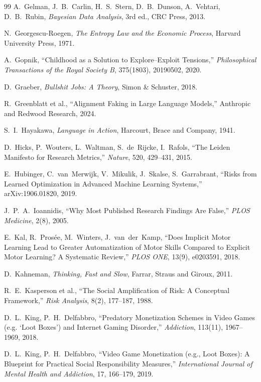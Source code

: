 \begin{thebibliography}{99}
A.~Gelman, J.~B.~Carlin, H.~S.~Stern, D.~B.~Dunson, A.~Vehtari, D.~B.~Rubin, \textit{Bayesian Data Analysis}, 3rd ed., CRC Press, 2013.

N.~Georgescu-Roegen, \textit{The Entropy Law and the Economic Process}, Harvard University Press, 1971.

A.~Gopnik, ``Childhood as a Solution to Explore--Exploit Tensions,'' \textit{Philosophical Transactions of the Royal Society B}, 375(1803), 20190502, 2020.

D.~Graeber, \textit{Bullshit Jobs: A Theory}, Simon \& Schuster, 2018.

R.~Greenblatt et al., ``Alignment Faking in Large Language Models,'' Anthropic and Redwood Research, 2024.

S.~I.~Hayakawa, \textit{Language in Action}, Harcourt, Brace and Company, 1941.

D.~Hicks, P.~Wouters, L.~Waltman, S.~de~Rijcke, I.~Rafols, ``The Leiden Manifesto for Research Metrics,'' \textit{Nature}, 520, 429--431, 2015.

E.~Hubinger, C.~van~Merwijk, V.~Mikulik, J.~Skalse, S.~Garrabrant, ``Risks from Learned Optimization in Advanced Machine Learning Systems,'' arXiv:1906.01820, 2019.

J.~P.~A.~Ioannidis, ``Why Most Published Research Findings Are False,'' \textit{PLOS Medicine}, 2(8), 2005.

E.~Kal, R.~Prosée, M.~Winters, J.~van~der~Kamp, ``Does Implicit Motor Learning Lead to Greater Automatization of Motor Skills Compared to Explicit Motor Learning? A Systematic Review,'' \textit{PLOS ONE}, 13(9), e0203591, 2018.

D.~Kahneman, \textit{Thinking, Fast and Slow}, Farrar, Straus and Giroux, 2011.

R.~E.~Kasperson et al., ``The Social Amplification of Risk: A Conceptual Framework,'' \textit{Risk Analysis}, 8(2), 177--187, 1988.

D.~L.~King, P.~H.~Delfabbro, ``Predatory Monetization Schemes in Video Games (e.g. `Loot Boxes') and Internet Gaming Disorder,'' \textit{Addiction}, 113(11), 1967--1969, 2018.

D.~L.~King, P.~H.~Delfabbro, ``Video Game Monetization (e.g., Loot Boxes): A Blueprint for Practical Social Responsibility Measures,'' \textit{International Journal of Mental Health and Addiction}, 17, 166--179, 2019.


\end{thebibliography}
